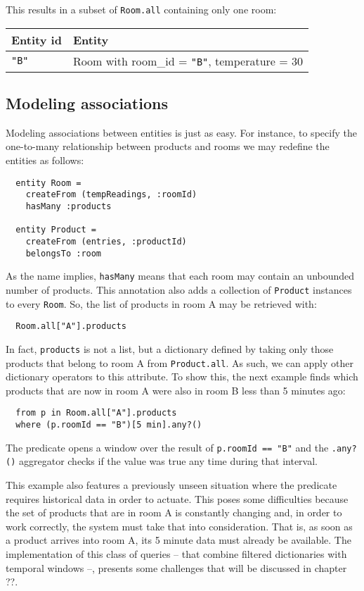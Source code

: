 \documentclass[a4,11pt]{report}
\begin{document}
This results in a subset of \verb=Room.all= containing only one room:

\begin{tabular}{ |l|l| }
  \hline
  Entity id & Entity \\
  \hline
  \verb="B"= & Room with room\_id = \verb="B"=, temperature = 30 \\
  \hline
\end{tabular}

\subsection{Modeling associations}

Modeling associations between entities is just as easy. For instance,
to specify the one-to-many relationship between products and rooms we
may redefine the entities as follows:

\begin{lstlisting}
  entity Room =
    createFrom (tempReadings, :roomId)
    hasMany :products

  entity Product =
    createFrom (entries, :productId)
    belongsTo :room
\end{lstlisting}

As the name implies, \verb=hasMany= means that each room may contain
an unbounded number of products. This annotation also adds a
collection of \verb=Product= instances to every \verb=Room=. So, the
list of products in room A may be retrieved with:

\begin{lstlisting}
  Room.all["A"].products
\end{lstlisting}

In fact, \verb=products= is not a list, but a dictionary defined by
taking only those products that belong to room A from
\verb=Product.all=. As such, we can apply other dictionary operators
to this attribute. To show this, the next example finds which products
that are now in room A were also in room B less than 5 minutes ago:

\begin{lstlisting}
  from p in Room.all["A"].products
  where (p.roomId == "B")[5 min].any?()
\end{lstlisting}

The predicate opens a window over the result of \verb!p.roomId == "B"!
and the \verb=.any?()= aggregator checks if the value was true any
time during that interval.

This example also features a previously unseen situation where the
predicate requires historical data in order to actuate. This poses
some difficulties because the set of products that are in room A is
constantly changing and, in order to work correctly, the system must
take that into consideration. That is, as soon as a product arrives
into room A, its 5 minute data must already be available. The
implementation of this class of queries -- that combine filtered
dictionaries with temporal windows --, presents some challenges that
will be discussed in chapter ??.
\end{document}
